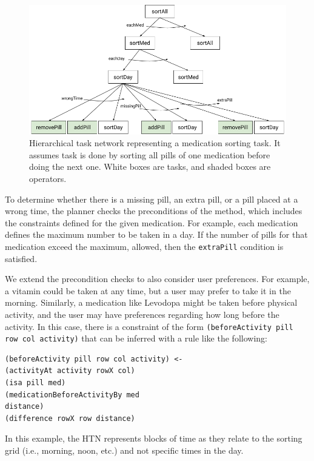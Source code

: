 \documentclass[letterpaper]{article}
\begin{document}
\begin{figure}[h]
\centering
\includegraphics[width=0.99\columnwidth]{medsorting_htn.png}
\caption{Hierarchical task network representing a medication sorting task. It assumes task is done by sorting all pills of one medication before doing the next one. White boxes are tasks, and shaded boxes are operators.  }
\label{fig:htn}
\end{figure}

To determine whether there is a missing pill, an extra pill, or a pill placed at a wrong time, the planner %
checks the preconditions of the method, which includes the constraints defined for the given medication.  For example, each medication defines the maximum number to be taken in a day.  If the number of pills for that medication exceed the maximum, allowed, then the \texttt{extraPill} condition is satisfied.

We extend the precondition checks to also consider user preferences.
For example, a vitamin could be taken at any time, but a user may prefer to take it in the morning.  Similarly, a medication like Levodopa might be taken before physical activity, and the user may have preferences regarding how long before the activity.  In this case, there is a constraint of the form \texttt{(beforeActivity pill row col activity)} that can be inferred with a rule like the following:

\small{
\begin{verbatim}
(beforeActivity pill row col activity) <-
(activityAt activity rowX col)
(isa pill med)
(medicationBeforeActivityBy med
distance)
(difference rowX row distance)
\end{verbatim}}

In this example, the HTN represents blocks of time as they relate to the sorting grid (i.e., morning, noon, etc.) and not specific times in the day.
\end{document}
